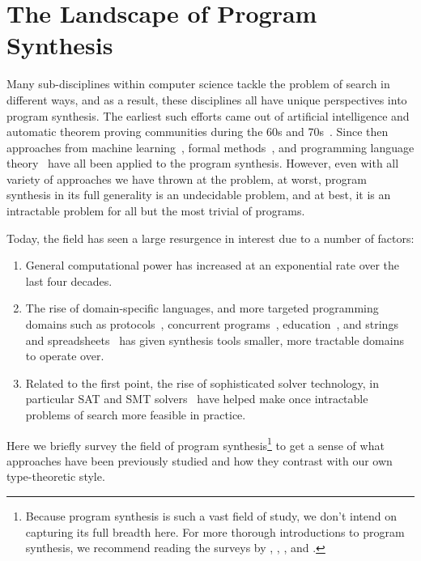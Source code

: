 \section{The Landscape of Program Synthesis}
\label{sec:the-landscape-of-program-synthesis}

Many sub-disciplines within computer science tackle the problem of search in different ways, and as a result, these disciplines all have unique perspectives into program synthesis.
The earliest such efforts came out of artificial intelligence and automatic theorem proving communities during the 60s and 70s~\citep{green-ijcai-1969, summers-popl-1976}.
Since then approaches from machine learning~\citep{lau-thesis-2001, briggs-kes-2008, weimer-icse-2009}, formal methods~\citep{srivastava-popl-2010, bodik-popl-2010, kuncak-pldi-2010}, and programming language theory~\citep{albarghouthi-cav-2013, gvero-pldi-2013, scherer-icfp-2015} have all been applied to the program synthesis.
However, even with all variety of approaches we have thrown at the problem, at worst, program synthesis in its full generality is an undecidable problem, and at best, it is an intractable problem for all but the most trivial of programs.

Today, the field has seen a large resurgence in interest due to a number of factors:
\begin{enumerate}
  \item General computational power has increased at an exponential rate over the last four decades.~\citep{moore-electronics-1965}
  \item The rise of domain-specific languages, and more targeted programming domains such as protocols~\citep{alur-popl-2005, udupa-pldi-2013}, concurrent programs~\citep{solar-lezama-pldi-2008, cerny-cav-2011, prountzos-oopsla-2012}, education~\citep{singh-pldi-2013}, and strings and spreadsheets~\citep{gulwani-popl-2011} has given synthesis tools smaller, more tractable domains to operate over.
  \item Related to the first point, the rise of sophisticated solver technology, in particular SAT and SMT solvers~\citep{barrett-smt-2008} have helped make once intractable problems of search more feasible in practice.
\end{enumerate}
Here we briefly survey the field of program synthesis\footnote{%
  Because program synthesis is such a vast field of study, we don't intend on capturing its full breadth here.
  For more thorough introductions to program synthesis, we recommend reading the surveys by \citet{kreitz-automated-deduction-1998}, \citet{flener-jlp-1999}, \citet{gulwani-ppdp-2010}, and \citet{kitzelmann-aaip-2010}.
} to get a sense of what approaches have been previously studied and how they contrast with our own type-theoretic style.

